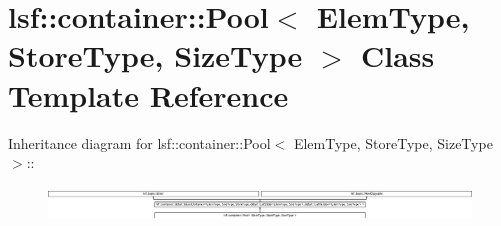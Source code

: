 \hypertarget{classlsf_1_1container_1_1Pool}{
\section{lsf::container::Pool$<$ ElemType, StoreType, SizeType $>$ Class Template Reference}
\label{classlsf_1_1container_1_1Pool}
}
Inheritance diagram for lsf::container::Pool$<$ ElemType, StoreType, SizeType $>$::\begin{figure}[H]
\begin{center}
\leavevmode
\includegraphics[height=0.930233cm]{classlsf_1_1container_1_1Pool}
\end{center}
\end{figure}
